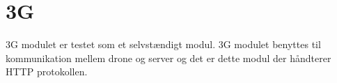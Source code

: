 \section{3G}

3G modulet er testet som et selvstændigt modul. 3G modulet benyttes til kommunikation mellem drone og server og det er dette modul der håndterer HTTP protokollen. 
